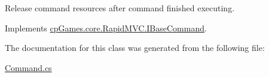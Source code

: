 Release command resources after command finished executing. 



Implements \mbox{\hyperlink{interfacecp_games_1_1core_1_1_rapid_m_v_c_1_1_i_base_command_aaf935c8b144d93bffac5b2e4fbe9881b}{cp\+Games.\+core.\+Rapid\+M\+V\+C.\+I\+Base\+Command}}.



The documentation for this class was generated from the following file\+:\begin{DoxyCompactItemize}
\item 
\mbox{\hyperlink{_command_8cs}{Command.\+cs}}\end{DoxyCompactItemize}
